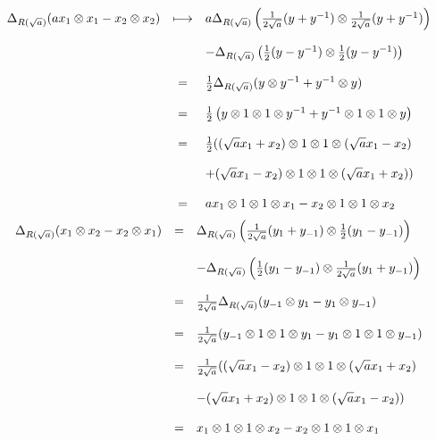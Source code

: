 \documentclass[10pt,a4paper]{article}
\newcommand{\bao}[1]{\begin{array}{#1}}
\newcommand{\ea}{\end{array}}
\begin{document}
$$\begin{array}{rcl}
\Delta_{\pvextens}(a x_1 \otimes x_1 - x_2 \otimes x_2) &\longmapsto& a \Delta_{\pvextens}\left(\frac{1}{2\sqrt{a}} (y + y^{-1}) \otimes \frac{1}{2\sqrt{a}} (y + y^{-1})\right)\\
&&\\
&& - \Delta_{\pvextens}\left(
\frac{1}{2} (y - y^{-1}) \otimes \frac{1}{2} (y - y^{-1})
\right)\\
&&\\
&=& \frac{1}{2} \Delta_{\pvextens}(y \otimes y^{-1} + y^{-1} \otimes y)\\
&&\\
&=& \frac{1}{2} \left(y \otimes 1 \otimes 1 \otimes y^{-1} + y^{-1} \otimes 1 \otimes 1 \otimes y\right)\\
&&\\
&=& \frac{1}{2} ((\sqrt{a} x_1 + x_2) \otimes 1 \otimes 1 \otimes (\sqrt{a} x_1 - x_2)\\&&\\&& + (\sqrt{a} x_1 - x_2) \otimes 1 \otimes 1 \otimes (\sqrt{a} x_1 + x_2))\\
&&\\
&=& a x_1 \otimes 1 \otimes 1 \otimes x_1 - x_2 \otimes 1 \otimes 1 \otimes x_2\\
\ea$$
$$\bao{rcl}
\Delta_{\pvextens}(x_1 \otimes x_2 - x_2 \otimes x_1) &=& \Delta_{\pvextens}\left(\frac{1}{2 \sqrt{a}} (y_1 + y_{-1}) \otimes \frac{1}{2} (y_1 - y_{-1})\right)\\
&&\\
&& - \Delta_{\pvextens}\left(\frac{1}{2} (y_1 - y_{-1}) \otimes \frac{1}{2\sqrt{a}} (y_1 + y_{-1})\right)\\
&&\\
&=& \frac{1}{2 \sqrt{a}} \Delta_{\pvextens}(y_{-1} \otimes y_{1} - y_{1} \otimes y_{-1})\\
&&\\
&=& \frac{1}{2 \sqrt{a}} (y_{-1} \otimes 1 \otimes 1 \otimes y_{1} - y_1 \otimes 1 \otimes 1 \otimes y_{-1})\\
&&\\
&=& \frac{1}{2 \sqrt{a}} ((\sqrt{a} x_1 - x_2) \otimes 1 \otimes 1 \otimes (\sqrt{a} x_1 + x_2)\\
&&\\
&& - (\sqrt{a} x_1 + x_2) \otimes 1 \otimes 1 \otimes (\sqrt{a} x_1 - x_2))\\
&&\\
&=& x_1 \otimes 1 \otimes 1 \otimes x_2 - x_2 \otimes 1 \otimes 1 \otimes x_1\\
\end{array}$$
\end{document}
